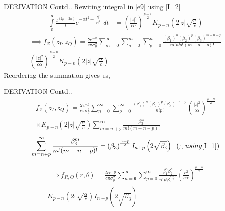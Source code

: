 \documentclass{beamer}
\providecommand{\brak}[1]{\ensuremath{\left(#1\right)}}
\begin{document}
\begin{frame}{DERIVATION Contd..}
    Rewiting integral in \eqref{e9} using \eqref{I_2}
    \begin{align}
        \int\limits_{0}^{\infty}\frac{t^{(2p-2n)}}{t}e^{-\alpha t^2-\frac{|z|^2}{ct^2}}\;dt&=\brak{\frac{|z|^2}{c\alpha}}^\frac{p-n}{2}K_{p-n}\brak{2|z|\sqrt{\frac{\alpha}{c}}}
    \end{align}
    \begin{multline}
       \implies f_{Z}\brak{z_I,z_Q} =\frac{2e^{-g}}{c\pi\sigma_y^2}\sum\limits_{m=0}^{\infty}\sum\limits_{n=0}^{m}\sum\limits_{p=0}^{n}\frac{(\beta_1)^n(\beta_2 )^p(\beta_3)^{m-n-p}}{m!n!p!(m-n-p)!}\\\brak{\frac{|z|^2}{c\alpha}}^\frac{p-n}{2}K_{p-n}\brak{2|z|\sqrt{\frac{\alpha}{c}}}
    \end{multline}
    Reordering the summation gives us,
\end{frame}
\begin{frame}{DERIVATION Contd..}
    \begin{multline}
        f_{Z}\brak{z_I,z_Q} =\frac{2e^{-g}}{c\pi\sigma_y^2}\sum\limits_{n=0}^{\infty}\sum\limits_{p=0}^{\infty}\frac{(\beta_1)^n(\beta_2 )^p(\beta_3)^{-n-p}}{n!p!}\brak{\frac{|z|^2}{c\alpha}}^\frac{p-n}{2}\\\times K_{p-n}\brak{2|z|\sqrt{\frac{\alpha}{c}}}\sum\limits_{m=n+p}^{\infty}\frac{\beta_3^m}{m!(m-n-p)!}
    \end{multline}
    \begin{align}
        \sum\limits_{m=n+p}^{\infty}\frac{\beta_3^m}{m!(m-n-p)!}=\brak{\beta_3}^{\frac{n+p}{2}}I_{n+p}\brak{2\sqrt{\beta_3}}\;\; (\therefore using \eqref{I_1} )
    \end{align}
    
     \begin{multline}
       \implies f_{R,\Theta}\brak{r,\theta}=\frac{2re^{-g}}{c\pi\sigma_y^2}\sum\limits_{n=0}^{\infty}\sum\limits_{p=0}^{\infty}\frac{\beta_1^n\beta_2^p}{n!p!\beta_3^{\frac{n+p}{2}}}\brak{\frac{r^2}{c\alpha}}^\frac{p-n}{2} \\K_{p-n}\brak{2r\sqrt{\frac{\alpha}{c}}}I_{n+p}\brak{2\sqrt{\beta_3}}
     \end{multline}
\end{frame}
\end{document}
